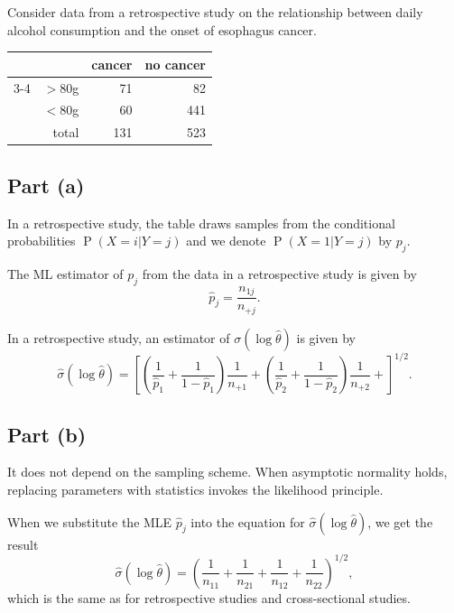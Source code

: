 \documentclass[
]{article}
\begin{document}
Consider data from a retrospective study on the relationship between
daily alcohol consumption and the onset of esophagus cancer.

\begin{table}[h]
\centering
\begin{tabular}{@{}rrrr@{}}
\toprule
                                            &           & cancer&no cancer\\
\cmidrule{3-4}
\multirow{2}{*}{daily alcohol consumption}  & $> 80$g   & 71    & 82\\
                                            & $< 80$g   & 60    & 441\\
                                            & total     & 131   & 523\\
\bottomrule
\end{tabular}
\end{table}

\hypertarget{part-a}{%
\subsection{Part (a)}\label{part-a}}


In a retrospective study, the table draws samples from the conditional
probabilities \(\operatorname{P}(X = i | Y = j)\) and we denote
\(\operatorname{P}(X = 1 | Y = j)\) by \(p_j\).

The ML estimator of \(p_j\) from the data in a retrospective study is
given by \[
  \hat p_j = \frac{n_{1 j}}{n_{+j}}.
\]

In a retrospective study, an estimator of \(\sigma(\log \hat\theta)\) is
given by \[
  \hat\sigma(\log \hat\theta) = \left[
    \left(\frac{1}{\hat{p}_1} + \frac{1}{1-\hat{p}_1}\right)\frac{1}{n_{+1}} +
    \left(\frac{1}{\hat{p}_2} + \frac{1}{1-\hat{p}_2}\right)\frac{1}{n_{+2}} +
    \right]^{1/2}.
\]

\hypertarget{part-b}{%
\subsection{Part (b)}\label{part-b}}


It does not depend on the sampling scheme. When asymptotic normality
holds, replacing parameters with statistics invokes the likelihood
principle.

When we substitute the MLE \(\hat p_j\) into the equation for
\(\hat \sigma(\log \hat \theta)\), we get the result \[
  \hat\sigma(\log \hat\theta) = \left(\frac{1}{n_{1 1}} + \frac{1}{n_{2 1}} + \frac{1}{n_{1 2}} + \frac{1}{n_{2 2}} \right)^{1/2},
\] which is the same as for retrospective studies and cross-sectional
studies.
\end{document}
